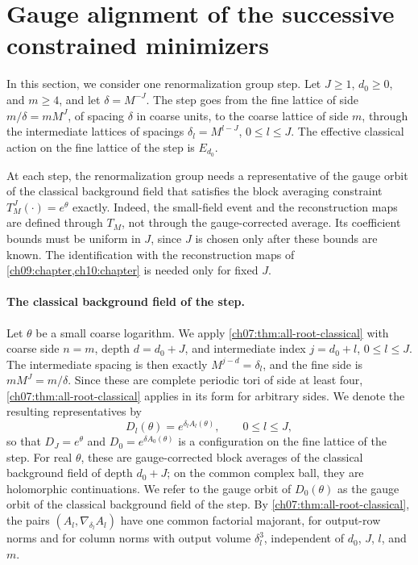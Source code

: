 \section{Gauge alignment of the successive constrained minimizers}\label{ch08:sec:alignment}

In this section, we consider one renormalization group step. Let $J\ge1$, $d_0\ge0$, and $m\ge4$, and let $\delta=M^{-J}$. The step goes from the fine lattice of side $m/\delta=mM^J$, of spacing $\delta$ in coarse units, to the coarse lattice of side $m$, through the intermediate lattices of spacings $\delta_l=M^{l-J}$, $0\le l\le J$. The effective classical action on the fine lattice of the step is $E_{d_0}$.

At each step, the renormalization group needs a representative of the gauge orbit of the classical background field that satisfies the block averaging constraint $T_M^J(\cdot)=e^\theta$ exactly. Indeed, the small-field event and the reconstruction maps are defined through $T_M$, not through the gauge-corrected average. Its coefficient bounds must be uniform in $J$, since $J$ is chosen only after these bounds are known. The identification with the reconstruction maps of \cref{ch09:chapter,ch10:chapter} is needed only for fixed $J$.

\paragraph{The classical background field of the step.}
Let $\theta$ be a small coarse logarithm. We apply \cref{ch07:thm:all-root-classical} with coarse side $n=m$, depth $d=d_0+J$, and intermediate index $j=d_0+l$, $0\le l\le J$. The intermediate spacing is then exactly $M^{j-d}=\delta_l$, and the fine side is $mM^J=m/\delta$. Since these are complete periodic tori of side at least four, \cref{ch07:thm:all-root-classical} applies in its form for arbitrary sides. We denote the resulting representatives by
\[
 D_l(\theta)=e^{\delta_lA_l(\theta)},\qquad 0\le l\le J,
\]
so that $D_J=e^\theta$ and $D_0=e^{\delta A_0(\theta)}$ is a configuration on the fine lattice of the step. For real $\theta$, these are gauge-corrected block averages of the classical background field of depth $d_0+J$; on the common complex ball, they are holomorphic continuations. We refer to the gauge orbit of $D_0(\theta)$ as the gauge orbit of the classical background field of the step. By \cref{ch07:thm:all-root-classical}, the pairs $(A_l,\nabla_{\delta_l}A_l)$ have one common factorial majorant, for output-row norms and for column norms with output volume $\delta_l^3$, independent of $d_0$, $J$, $l$, and $m$.

